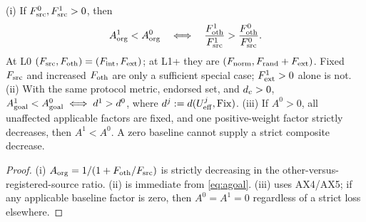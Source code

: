 \begin{lemma}
\label{lem:strict-comparison}
(i) If $F_{\mathrm{src}}^0,F_{\mathrm{src}}^1>0$, then
\[
A_{\mathrm{org}}^1<A_{\mathrm{org}}^0\quad\Longleftrightarrow\quad
\frac{F_{\mathrm{oth}}^1}{F_{\mathrm{src}}^1}>\frac{F_{\mathrm{oth}}^0}{F_{\mathrm{src}}^0}.
\]
At L0 $(F_{\mathrm{src}},F_{\mathrm{oth}})=(F_{\mathrm{int}},F_{\mathrm{ext}})$; at L1+ they are
$(F_{\mathrm{norm}},F_{\mathrm{rand}}+F_{\mathrm{ext}})$. Fixed $F_{\mathrm{src}}$ and increased $F_{\mathrm{oth}}$ are only a
sufficient special case; $F_{\mathrm{ext}}^1>0$ alone is not. (ii) With the same protocol metric, endorsed set,
and $d_{c}>0$, $A_{\mathrm{goal}}^1<A_{\mathrm{goal}}^0\iff d^1>d^0$, where
$d^j:=d(U_{\mathrm{eff}}^j,\mathrm{Fix})$. (iii) If $A^0>0$, all unaffected applicable factors
are fixed, and one positive-weight factor strictly decreases, then $A^1<A^0$.
A zero baseline cannot supply a strict composite decrease.
\end{lemma}
\begin{proof}
(i) $A_{\mathrm{org}}=1/(1+F_{\mathrm{oth}}/F_{\mathrm{src}})$ is strictly decreasing in the
other-versus-registered-source ratio. (ii) is immediate from \eqref{eq:agoal}.
(iii) uses AX4/AX5; if any
applicable baseline factor is zero, then $A^0=A^1=0$ regardless of a strict
loss elsewhere.
\end{proof}

